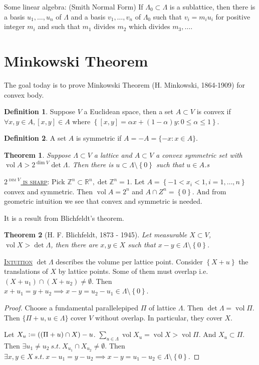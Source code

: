 \documentclass{report}
\newcommand{\R}{\mathbb{R}}
\newcommand{\Z}{\mathbb{Z}}
\newcommand{\st}{\ s.t.\ }
\newcommand{\vol}{\operatorname{vol}}
\newcommand{\set}[1]{\left\{ #1 \right\}}
\newcommand{\defeq}{\vcentcolon=}
\newcommand{\fancyem}[1]{\underline{\textsc{#1}}}
\newtheorem{theorem}{Theorem}[section]
\theoremstyle{definition}
\newtheorem{definition}{Definition}[section]
\theoremstyle{remark}
\numberwithin{equation}{section}
\begin{document}
Some linear algebra: (Smith Normal Form) If $\Lambda_0 \subset \Lambda$ is a sublattice, then there is a basis $u_1, \ldots, u_n$ of $\Lambda$ and a basis $v_1, \ldots, v_n$ of $\Lambda_0$ such that $v_i = m_iu_i$ for positive integer $m_i$ and such that $m_1$ divides $m_2$ which divides $m_3, \ldots$.

\section{Minkowski Theorem}
The goal today is to prove Minkowski Theorem (H. Minkowski, 1864-1909) for convex body.

\begin{definition}
    Suppose $V$ a Euclidean space, then a set $A \subset V$ is convex if $\forall x, y \in A, [x, y] \in A$ where $\set{[x, y] = \alpha x + (1-\alpha)y: 0 \leq \alpha \leq 1}$.
\end{definition}
\begin{definition}
    A set $A$ is symmetric if $A = -A = \{-x: x \in A\}$.
\end{definition}

\begin{theorem}
    Suppose $\Lambda \subset V$ a lattice and $A \subset V$ a convex symmetric set with $\vol A > 2^{\dim V} \det \Lambda$. Then there is $u \subset \Lambda \setminus \set{0}$ such that $u \in A$.s
\end{theorem}

\fancyem{$2^{\dim V}$ is sharp}: Pick $\Z^n \subset \R^n, \det \Z^n = 1$. Let $A = \set{-1 < x_i < 1,  i = 1, \ldots, n}$ convex and symmetric. Then $\vol A = 2^n$ and $A \cap Z^n = \set{0}$. And from geometric intuition we see that convex and symmetric is needed.

It is a result from Blichfeldt's theorem.
\begin{theorem}[H. F. Blichfeldt, 1873 - 1945]
    Let measurable $X \subset V$, $\vol X > \det \Lambda$, then there are $x, y \in X$ such that $x - y \in \Lambda \setminus \set{0}$.
\end{theorem}

\fancyem{Intuition} $\det \Lambda$ describes the volume per lattice point. Consider $\set{X + u}$ the translations of $X$ by lattice points. Some of them must overlap i.e. $(X + u_1) \cap (X + u_2) \neq \emptyset$. Then $x + u_1 = y + u_2 \implies x - y = u_2 - u_1 \in \Lambda \setminus \set{0}$.

\begin{proof}
    Choose a fundamental parallelepiped $\Pi$ of lattice $\Lambda$. Then $\det \Lambda = \vol \Pi$. Then $\{\Pi + u, u \in \Lambda\}$ cover $V$ without overlap. In particular, they cover $X$.

    Let $X_u \defeq ((\Pi + u) \cap X) - u$. $\sum_{u \in \Lambda} \vol X_u = \vol X > \vol \Pi$. And $X_u \subset \Pi$. Then $\exists u_1 \neq u_2 \st X_{u_1} \cap X_{u_2}\neq \emptyset$. Then $\exists x, y \in X \st x - u_1 = y - u_2 \implies x - y = u_1 - u_2 \in \Lambda \setminus \set{0}$.
\end{proof}
\end{document}
